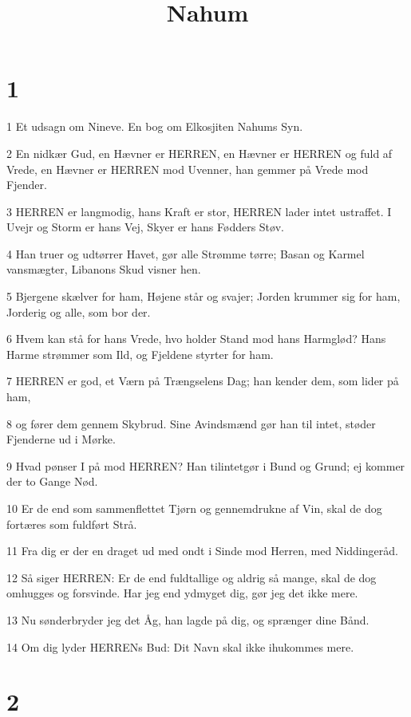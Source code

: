 

\title{Nahum}


\chapter{1}

\par 1 Et udsagn om Nineve. En bog om Elkosjiten Nahums Syn.
\par 2 En nidkær Gud, en Hævner er HERREN, en Hævner er HERREN og fuld af Vrede, en Hævner er HERREN mod Uvenner, han gemmer på Vrede mod Fjender.
\par 3 HERREN er langmodig, hans Kraft er stor, HERREN lader intet ustraffet. I Uvejr og Storm er hans Vej, Skyer er hans Fødders Støv.
\par 4 Han truer og udtørrer Havet, gør alle Strømme tørre; Basan og Karmel vansmægter, Libanons Skud visner hen.
\par 5 Bjergene skælver for ham, Højene står og svajer; Jorden krummer sig for ham, Jorderig og alle, som bor der.
\par 6 Hvem kan stå for hans Vrede, hvo holder Stand mod hans Harmglød? Hans Harme strømmer som Ild, og Fjeldene styrter for ham.
\par 7 HERREN er god, et Værn på Trængselens Dag; han kender dem, som lider på ham,
\par 8 og fører dem gennem Skybrud. Sine Avindsmænd gør han til intet, støder Fjenderne ud i Mørke.
\par 9 Hvad pønser I på mod HERREN? Han tilintetgør i Bund og Grund; ej kommer der to Gange Nød.
\par 10 Er de end som sammenflettet Tjørn og gennemdrukne af Vin, skal de dog fortæres som fuldført Strå.
\par 11 Fra dig er der en draget ud med ondt i Sinde mod Herren, med Niddingeråd.
\par 12 Så siger HERREN: Er de end fuldtallige og aldrig så mange, skal de dog omhugges og forsvinde. Har jeg end ydmyget dig, gør jeg det ikke mere.
\par 13 Nu sønderbryder jeg det Åg, han lagde på dig, og sprænger dine Bånd.
\par 14 Om dig lyder HERRENs Bud: Dit Navn skal ikke ihukommes mere.

\chapter{2}

